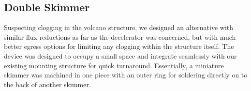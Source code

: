 \subsection{Double Skimmer}

Suspecting clogging in the volcano structure, we designed an alternative with similar flux reductions as far as the decelerator was concerned, but with much better egress options for limiting any clogging within the structure itself.
The device was designed to occupy a small space and integrate seamlessly with our existing mounting structure for quick turnaround.
Essentially, a miniature skimmer was machined in one piece with an outer ring for soldering directly on to the back of another skimmer.







\ifx\justbeingincluded\undefined

\fi
